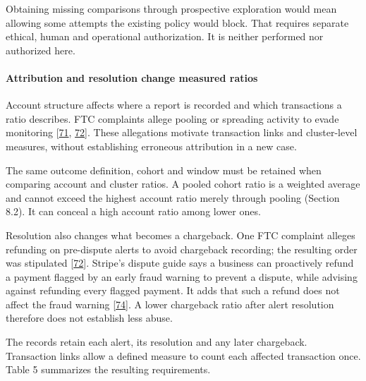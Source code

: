 \documentclass[
  11pt,
]{article}
\begin{document}
Obtaining missing comparisons through prospective exploration would mean
allowing some attempts the existing policy would block. That requires
separate ethical, human and operational authorization. It is neither
performed nor authorized here.

\hypertarget{attribution-and-resolution-change-measured-ratios}{%
\paragraph{Attribution and resolution change measured
ratios}\label{attribution-and-resolution-change-measured-ratios}}

Account structure affects where a report is recorded and which
transactions a ratio describes. FTC complaints allege pooling or
spreading activity to evade monitoring
{[}\protect\hyperlink{ref-FTC2020FirstData}{71},
\protect\hyperlink{ref-FTC2025Paddle}{72}{]}. These allegations motivate
transaction links and cluster-level measures, without establishing
erroneous attribution in a new case.

The same outcome definition, cohort and window must be retained when
comparing account and cluster ratios. A pooled cohort ratio is a
weighted average and cannot exceed the highest account ratio merely
through pooling (Section 8.2). It can conceal a high account ratio among
lower ones.

Resolution also changes what becomes a chargeback. One FTC complaint
alleges refunding on pre-dispute alerts to avoid chargeback recording;
the resulting order was stipulated
{[}\protect\hyperlink{ref-FTC2025Paddle}{72}{]}. Stripe's dispute guide
says a business can proactively refund a payment flagged by an early
fraud warning to prevent a dispute, while advising against refunding
every flagged payment. It adds that such a refund does not affect the
fraud warning {[}\protect\hyperlink{ref-Stripe2026Disputes}{74}{]}. A
lower chargeback ratio after alert resolution therefore does not
establish less abuse.

The records retain each alert, its resolution and any later chargeback.
Transaction links allow a defined measure to count each affected
transaction once. Table 5 summarizes the resulting requirements.
\end{document}
